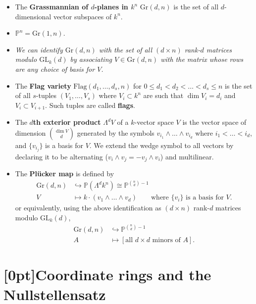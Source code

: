 \documentclass[10pt]{article}
\newcommand{\pee}{\mathbb{P}}
\newcommand{\AG}{\textcolor{green}{AG}}
\begin{document}
            \begin{itemize}
                \item The \textbf{Grassmannian of $d$-planes in $k^n$} $\mathrm{Gr}(d,n)$ is the set of all $d$-dimensional vector subspaces of $k^n$.
                \item $\pee^n=\mathrm{Gr}(1,n)$.
                \item \emph{We can identify $\mathrm{Gr}(d,n)$ with the set of all $(d\times n)$ rank-$d$ matrices modulo $\mathrm{GL}_k(d)$ by associating $V\in\mathrm{Gr}(d,n)$ with the matrix whose rows are any choice of basis for $V$.}
                \item The \textbf{Flag variety} $\mathrm{Flag}(d_1,\ldots,d_s,n)$ for $0\leqslant d_1<d_2<\ldots<d_s\leqslant n$ is the set of all $s$-tuples $(V_1,\ldots,V_s)$ where $V_i\subset k^n$ are such that $\dim V_i=d_i$ and $V_i\subset V_{i+1}$.
                    Such tuples are called \textbf{flags}.
                \item The \textbf{$d$th exterior product} $\Lambda^dV$ of a $k$-vector space $V$ is the vector space of dimension $\binom{\dim V}{d}$ generated by the symbols $v_{i_1}\wedge\ldots\wedge v_{i_d}$ where $i_1<\ldots<i_d$, and $\{v_{i_j}\}$ is a basis for $V$.
                    We extend the wedge symbol to all vectors by declaring it to be alternating ($v_i\wedge v_j=-v_j\wedge v_i$) and multilinear.
                \item The \textbf{Plücker map} is defined by
                    \begin{align*}
                        \mathrm{Gr}(d,n) &\hookrightarrow \pee(\Lambda^d k^n)\cong\pee^{\binom{n}{d}-1}\\
                        V &\mapsto k\cdot(v_1\wedge\ldots\wedge v_d)\qquad\text{where $\{v_i\}$ is a basis for $V$.}
                    \end{align*}
                    or equivalently, using the above identification as $(d\times n)$ rank-$d$ matrices modulo $\mathrm{GL}_k(d)$,
                    \begin{align*}
                        \mathrm{Gr}(d,n) &\hookrightarrow \pee^{\binom{n}{d}-1}\\
                        A&\mapsto[\text{all $d\times d$ minors of $A$}].
                    \end{align*}
            \end{itemize}

    \section{\protect\marginnote{\AG}[0pt]Coordinate rings and the Nullstellensatz}
\end{document}
